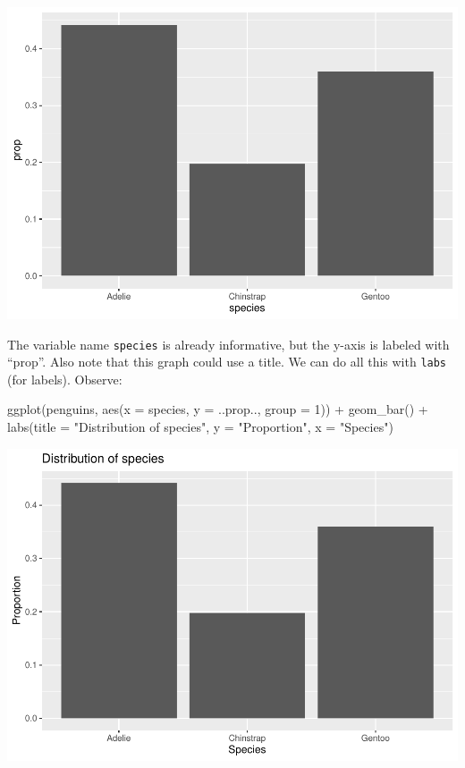 \documentclass[
]{book}
\newenvironment{Shaded}{\begin{snugshade}}{\end{snugshade}}
\newcommand{\AttributeTok}[1]{\textcolor[rgb]{0.77,0.63,0.00}{#1}}
\newcommand{\DecValTok}[1]{\textcolor[rgb]{0.00,0.00,0.81}{#1}}
\newcommand{\FunctionTok}[1]{\textcolor[rgb]{0.00,0.00,0.00}{#1}}
\newcommand{\NormalTok}[1]{#1}
\newcommand{\SpecialCharTok}[1]{\textcolor[rgb]{0.00,0.00,0.00}{#1}}
\newcommand{\StringTok}[1]{\textcolor[rgb]{0.31,0.60,0.02}{#1}}
\begin{document}
\includegraphics{intro_stats_files/figure-latex/unnamed-chunk-70-1.pdf}

The variable name \texttt{species} is already informative, but the y-axis is labeled with ``prop''. Also note that this graph could use a title. We can do all this with \texttt{labs} (for labels). Observe:

\begin{Shaded}
\begin{Highlighting}[]
\FunctionTok{ggplot}\NormalTok{(penguins, }\FunctionTok{aes}\NormalTok{(}\AttributeTok{x =}\NormalTok{ species, }\AttributeTok{y =}\NormalTok{ ..prop.., }\AttributeTok{group =} \DecValTok{1}\NormalTok{)) }\SpecialCharTok{+}
    \FunctionTok{geom\_bar}\NormalTok{() }\SpecialCharTok{+}
    \FunctionTok{labs}\NormalTok{(}\AttributeTok{title =} \StringTok{"Distribution of species"}\NormalTok{,}
         \AttributeTok{y =} \StringTok{"Proportion"}\NormalTok{,}
         \AttributeTok{x =} \StringTok{"Species"}\NormalTok{)}
\end{Highlighting}
\end{Shaded}

\includegraphics{intro_stats_files/figure-latex/unnamed-chunk-71-1.pdf}
\end{document}

